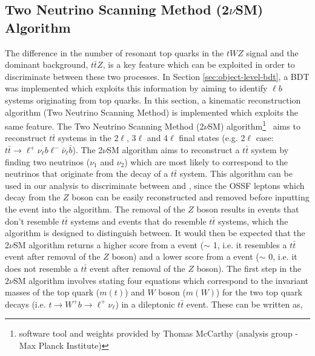 \subsection{Two Neutrino Scanning Method (2$\nu$SM) Algorithm}
\label{sec:2vsm}
The difference in the number of resonant top quarks in the $tWZ$ signal and the dominant background, $t\bar{t}Z$, is a key feature which can be exploited in order to discriminate between these two processes. In Section \ref{sec:object-level-bdt}, a BDT was implemented which exploits this information by aiming to identify $\ell b$ systems originating from top quarks. In this section, a kinematic reconstruction algorithm (Two Neutrino Scanning Method) is implemented which exploits the same feature. The Two Neutrino Scanning Method (2$\nu$SM) algorithm\footnote{software tool and weights provided by Thomas McCarthy (\ttZ analysis group - Max Planck Institute)}~\cite{2vSM-ref1,2vSM-ref2} aims to reconstruct $t\bar{t}$ systems in the 2$\ell$, 3$\ell$ and 4$\ell$ final states (e.g. 2$\ell$ case: $t\bar{t}\rightarrow \ell^{+}\nu_{\ell}b\ell^{-}\bar{\nu}_{\ell}\bar{b}$). The 2$\nu$SM algorithm aims to reconstruct a $t\bar{t}$ system by finding two neutrinos ($\nu_{1}$ and $\nu_{2}$) which are most likely to correspond to the neutrinos that originate from the decay of a $t\bar{t}$ system. This algorithm can be used in our analysis to discriminate between \tWZ and \ttZ, since the OSSF leptons which decay from the $Z$ boson can be easily reconstructed and removed before inputting the event into the algorithm. The removal of the $Z$ boson results in \tWZ events that don't resemble $t\bar{t}$ systems and \ttZ events that do resemble $t\bar{t}$ systems, which the algorithm is designed to distinguish between. It would then be expected that the 2$\nu$SM algorithm returns a higher score from a \ttZ event ($\sim$ 1, i.e. it resembles a $t\bar{t}$ event after removal of the $Z$ boson) and a lower score from a \tWZ event ($\sim$ 0, i.e. it does not resemble a $t\bar{t}$ event after removal of the $Z$ boson). The first step in the $2\nu$SM algorithm involves stating four equations which correspond to the invariant masses of the top quark ($m(t)$) and $W$ boson ($m(W)$) for the two top quark decays (i.e. $t\rightarrow W^{+}b \rightarrow \ell^{+} \nu_{\ell}$) in a dileptonic $t\bar{t}$ event. These can be written as,

